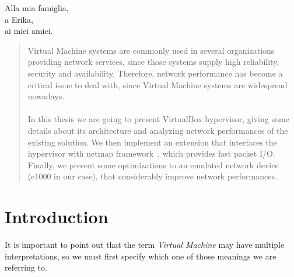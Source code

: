 \documentclass[a4paper, 12pt, titlepage]{report}
\newcommand{\emptypage}{\newpage\shipout\null}
\newenvironment{dedication}
  {\clearpage           %
   \thispagestyle{empty}%
   \vspace*{\stretch{1}}%
   \itshape             %
   \raggedleft          %
  }
  {\par %
   \vspace{\stretch{3}} %
   \clearpage           %
  }
\begin{document}
 \sloppy \onehalfspacing
%

\emptypage

\begin{dedication}
Alla mia famiglia,\\
a Erika,\\
ai miei amici.
\end{dedication}

\begin{abstract}
Virtual Machine systems are commonly used in several organizations providing network services, since those systems supply high reliability, security and availability. Therefore, network performance has become a critical issue to deal with, since Virtual Machine systems are widespread nowadays.
\\
\\
In this thesis we are going to present VirtualBox hypervisor, giving some details about its architecture and analyzing network performances of the existing solution. We then implement an extension that interfaces the hypervisor with netmap framework~\cite{netmap}, which provides fast packet I/O. Finally, we present some optimizations to an emulated network device (e1000 in our case), that considerably improve network performances.
\end{abstract}
\emptypage
\tableofcontents

\chapter{Introduction}

It is important to point out that the term \textit{Virtual Machine} may have multiple interpretations, so we must first specify which one of those meanings we are referring to.
\end{document}
